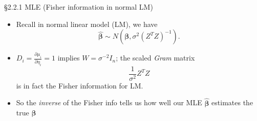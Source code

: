 \documentclass{beamer}
\newenvironment{wideitemize}%
  {\begin{itemize}%
    \setlength{\parskip}{1em}}%
  {\end{itemize}}
\begin{document}
\begin{frame}{\S2.2.1 MLE (Fisher information in normal LM)}

\begin{wideitemize}


\item Recall in normal linear model (LM), we have 
\[
\hat{\boldsymbol \beta} \sim N({\boldsymbol \beta}, 
\sigma^2({Z}^T{Z} )^{-1} ).
\]

\item $D_i = \frac{\partial \mu_i}{\partial \eta_i} = 1$ implies $W = \sigma^{-2} I_n$;  the scaled \emph{Gram} matrix 
\[
\frac{1}{\sigma^2}{ Z}^T{ Z}
\]
 is in fact the Fisher information for LM. 


\item So  the \emph{inverse} of the Fisher info tells us how well our MLE $\hat{\boldsymbol \beta}$ estimates the true ${\boldsymbol \beta}$ \end{wideitemize}
\end{frame}
\end{document}
